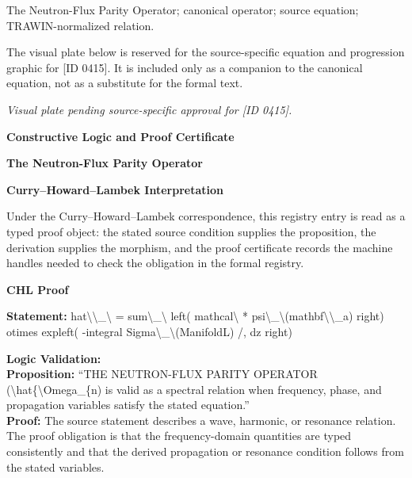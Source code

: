 The Neutron-Flux Parity Operator; canonical operator; source equation; TRAWIN-normalized relation.
\endgroup

\begingroup\footnotesize\sloppy
The visual plate below is reserved for the source-specific equation and progression graphic for [ID 0415]. It is included only as a companion to the canonical equation, not as a substitute for the formal text.
\par\endgroup
\begingroup\footnotesize\itshape
Visual plate pending source-specific approval for [ID 0415].
\par\endgroup

\clearpage
\begingroup\tzpsupportsetup
\noindent\textbf{\fontsize{10.8pt}{12.8pt}\selectfont [ID 0415] Constructive Logic and Proof Certificate}\par
\noindent\textbf{\fontsize{10pt}{12pt}\selectfont The Neutron-Flux Parity Operator}\par
\vspace{0.45em}
\begingroup
\footnotesize
\setlength{\parskip}{0.22em}
\setlength{\parindent}{0pt}
\noindent\textbf{Curry--Howard--Lambek Interpretation}\par
Under the Curry--Howard--Lambek correspondence, this registry entry is read as a typed proof
object: the stated source condition supplies the proposition, the derivation supplies the
morphism, and the proof certificate records the machine handles needed to check the obligation
in the formal registry.

\vspace{0.45em}
\noindent\textbf{CHL Proof}\par
\textbf{Statement:} hat\textbackslash{}\textbackslash{}\_\textbackslash{} = sum\textbackslash{}\_\textbackslash{} left( mathcal\textbackslash{} * psi\textbackslash{}\_\textbackslash{}(mathbf\textbackslash{}\textbackslash{}\_a) right) otimes expleft( -integral
Sigma\textbackslash{}\_\textbackslash{}(ManifoldL) /, dz right)

\textbf{Logic Validation:}\\
\textbf{Proposition:} ``THE NEUTRON-FLUX PARITY OPERATOR (\textbackslash{}hat\{\textbackslash{}Omega\_\{n) is valid as a spectral relation when
frequency, phase, and propagation variables satisfy the stated equation.''\\
\textbf{Proof:} The source statement describes a wave, harmonic, or resonance relation. The proof
obligation is that the frequency-domain quantities are typed consistently and that the
derived propagation or resonance condition follows from the stated variables.

